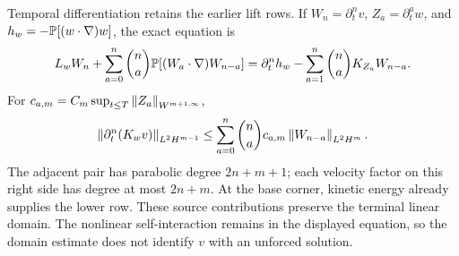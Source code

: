 Temporal differentiation retains the earlier lift rows. If
\(W_n=\partial_t^nv\), \(Z_a=\partial_t^aw\), and
\(h_w=-\mathbb P[(w\cdot\nabla)w]\), the exact equation is
\[
 L_wW_n+\sum_{a=0}^n\binom na
       \mathbb P[(W_a\cdot\nabla)W_{n-a}]
 =\partial_t^nh_w-\sum_{a=1}^n\binom na K_{Z_a}W_{n-a}.
\]
For \(c_{a,m}=C_m\sup_{t\le T}\left\lVert Z_a\right\rVert_{W^{m+1,\infty}}\),
\[
 \left\lVert \partial_t^n(K_wv)\right\rVert_{L^2H^{m-1}}
 \le\sum_{a=0}^n\binom na c_{a,m}\left\lVert W_{n-a}\right\rVert_{L^2H^m}.
\]
The adjacent pair has parabolic degree \(2n+m+1\); each velocity
factor on this right side has degree at most \(2n+m\).
At the base corner, kinetic energy already supplies the lower row.
These source contributions preserve the terminal linear domain.
The nonlinear self-interaction remains in the displayed equation, so
the domain estimate does not identify \(v\) with an unforced solution.
